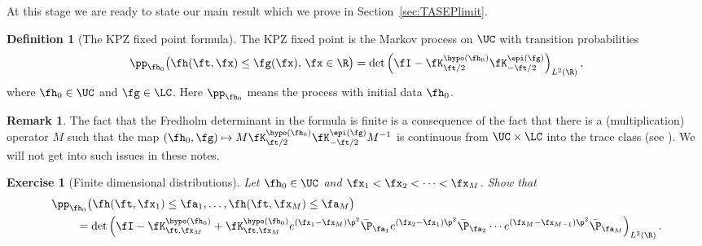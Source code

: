 \documentclass[]{pcmi}
\theoremstyle{plain}
\newtheorem{exercise}[equation]{Exercise}
\theoremstyle{definition}
\newtheorem{definition}[equation]{Definition}
\newtheorem{remark}[equation]{Remark}
\begin{document}
At this stage we are ready to state our main result which we prove in Section~\ref{sec:TASEPlimit}.

\begin{definition}[The KPZ fixed point formula] 
The KPZ fixed point is the Markov process on $\UC$ with transition probabilities 
\begin{equation}\label{eq:fpform}
 \pp_{\fh_0} \bigl( \fh(\ft, \fx) \le \fg(\fx),\,\fx\in\R\bigr)  = \det\left(\fI-\fK^{\hypo(\fh_0)}_{\ft/2} \fK^{\epi(\fg)}_{-\ft/2}\right)_{L^2(\R)},
\end{equation}
where $\fh_0\in\UC$ and $\fg\in \LC$. Here $ \pp_{\fh_0}$ means the process with initial data $\fh_0$.
\end{definition}

\begin{remark}
The fact that the Fredholm determinant in the formula is finite is a consequence of the fact that there is a (multiplication) operator $M$ such that 
the map $(\fh_0,\fg)\mapsto M\fK^{\hypo(\fh_0)}_{\ft/2} \fK^{\epi(\fg)}_{-\ft/2}M^{-1}$ is continuous from $\UC\times\LC$ into the trace class (see
\cite{KPZ}).  We will not get into such issues in these notes.
\end{remark}

\begin{exercise}[Finite dimensional distributions]  Let $\fh_0\in \UC$ and $\fx_1<\fx_2<\dotsm<\fx_M$. Show that 
\begin{align}
&\pp_{\fh_0} \bigl(\fh(\ft,\fx_1)\leq\fa_1,\ldots,\fh(\ft,\fx_M)\leq\fa_M\bigr)\nonumber\\
&\hspace{0.3in}=\det\left(\fI-\fK^{\hypo(\fh_0)}_{\ft,\fx_M}+\fK^{\hypo(\fh_0)}_{\ft,\fx_M} e^{(\fx_1-\fx_M)\p^2}\bar\P_{\fa_1}e^{(\fx_2-\fx_1)\p^2}\bar\P_{\fa_2}\dotsm e^{(\fx_M-\fx_{M-1})\p^2}\bar\P_{\fa_M}\right)_{L^2(\R)}.\label{eq:twosided-path}
\end{align}
\end{exercise}
\end{document}
